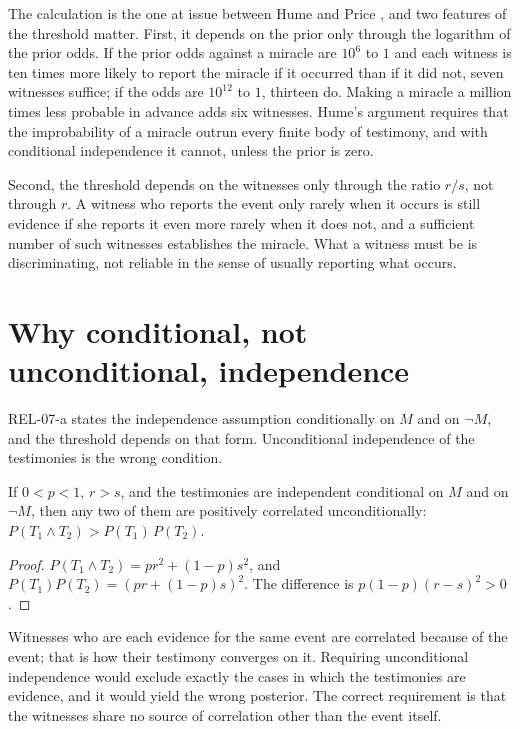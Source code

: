 \documentclass{situationist-preprint}
\begin{document}
The calculation is the one at issue between Hume and Price \citep{Owen1987}, and two features of the threshold matter. First, it depends on the prior only through the logarithm of the prior odds. If the prior odds against a miracle are $10^6$ to $1$ and each witness is ten times more likely to report the miracle if it occurred than if it did not, seven witnesses suffice; if the odds are $10^{12}$ to $1$, thirteen do. Making a miracle a million times less probable in advance adds six witnesses. Hume's argument requires that the improbability of a miracle outrun every finite body of testimony, and with conditional independence it cannot, unless the prior is zero.

Second, the threshold depends on the witnesses only through the ratio $r/s$, not through $r$. A witness who reports the event only rarely when it occurs is still evidence if she reports it even more rarely when it does not, and a sufficient number of such witnesses establishes the miracle. What a witness must be is discriminating, not reliable in the sense of usually reporting what occurs.

\section{Why conditional, not unconditional, independence}

REL-07-a states the independence assumption conditionally on $M$ and on $\neg M$, and the threshold depends on that form. Unconditional independence of the testimonies is the wrong condition.

\begin{proposition}\label{p:uncond}
If $0 < p < 1$, $r > s$, and the testimonies are independent conditional on $M$ and on $\neg M$, then any two of them are positively correlated unconditionally: $P(T_1 \wedge T_2) > P(T_1)\,P(T_2)$.
\end{proposition}

\begin{proof}
$P(T_1 \wedge T_2) = pr^2 + (1-p)s^2$, and $P(T_1)P(T_2) = (pr + (1-p)s)^2$. The difference is $p(1-p)(r - s)^2 > 0$.
\end{proof}

Witnesses who are each evidence for the same event are correlated because of the event; that is how their testimony converges on it. Requiring unconditional independence would exclude exactly the cases in which the testimonies are evidence, and it would yield the wrong posterior. The correct requirement is that the witnesses share no source of correlation other than the event itself.
\end{document}
